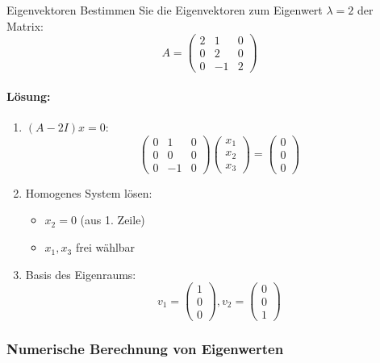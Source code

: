 \begin{example2}{Eigenvektoren}
Bestimmen Sie die Eigenvektoren zum Eigenwert $\lambda=2$ der Matrix:
$$A = \begin{pmatrix}
2 & 1 & 0 \\
0 & 2 & 0 \\
0 & -1 & 2
\end{pmatrix}$$

\paragraph{Lösung:}
\begin{enumerate}
    \item $(A-2I)x = 0$:
    $$\begin{pmatrix}
    0 & 1 & 0 \\
    0 & 0 & 0 \\
    0 & -1 & 0
    \end{pmatrix} \begin{pmatrix}
    x_1 \\ x_2 \\ x_3
    \end{pmatrix} = \begin{pmatrix}
    0 \\ 0 \\ 0
    \end{pmatrix}$$
    
    \item Homogenes System lösen:
    \begin{itemize}
        \item $x_2 = 0$ (aus 1. Zeile)
        \item $x_1, x_3$ frei wählbar
    \end{itemize}
    
    \item Basis des Eigenraums:
    $$v_1 = \begin{pmatrix} 1 \\ 0 \\ 0 \end{pmatrix}, 
    v_2 = \begin{pmatrix} 0 \\ 0 \\ 1 \end{pmatrix}$$
\end{enumerate}
\end{example2}

\subsubsection{Numerische Berechnung von Eigenwerten}

